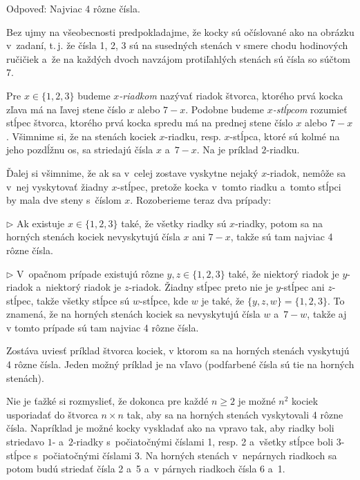 {%
Odpoveď: Najviac 4 rôzne čísla.

Bez ujmy na všeobecnosti predpokladajme, že kocky sú očíslované ako na obrázku v~zadaní, t.\,j. že čísla 1, 2, 3 sú na susedných stenách v smere chodu hodinových ručičiek a~že na každých dvoch navzájom protiľahlých stenách sú čísla so súčtom 7.

Pre $x \in \{1, 2, 3\}$ budeme {\it $x$-riadkom} nazývať riadok štvorca, ktorého prvá kocka zľava má na ľavej stene číslo $x$ alebo $7 - x$.
Podobne budeme {\it $x$-stĺpcom} rozumieť stĺpec štvorca, ktorého prvá kocka spredu má na prednej stene číslo $x$ alebo $7 - x$.
Všimnime si, že na stenách kociek $x$-riadku, resp. $x$-stĺpca, ktoré sú kolmé na jeho pozdĺžnu os, sa striedajú čísla $x$ a~$7 - x$. Na \obrplus\obr{} je príklad $2$-riadku.
%

Ďalej si všimnime, že ak sa v~celej zostave vyskytne nejaký $x$-riadok, nemôže sa v~nej vyskytovať žiadny $x$-stĺpec, pretože kocka v~tomto riadku a~tomto stĺpci by mala dve steny s~číslom $x$. Rozoberieme teraz dva prípady:

\smallskip

\item{$\triangleright$}
Ak existuje $x \in \{1, 2, 3\}$ také, že všetky riadky sú $x$-riadky, potom sa na horných stenách kociek nevyskytujú čísla $x$ ani $7 - x$, takže sú tam najviac 4 rôzne čísla.

\item{$\triangleright$}
V~opačnom prípade existujú rôzne $y,z\in \{1, 2, 3\}$ také, že niektorý riadok je \hbox{$y$-riadok} a~niektorý riadok je $z$-riadok. Žiadny stĺpec preto nie je $y$-stĺpec ani \hbox{$z$-stĺpec}, takže všetky stĺpce sú $w$-stĺpce, kde $w$ je také, že $\{y, z, w\} = \{1, 2, 3\}$. To znamená, že na horných stenách kociek sa nevyskytujú čísla $w$ a~$7 - w$, takže aj v tomto prípade sú tam najviac 4 rôzne čísla.

\smallskip\noindent

Zostáva uviesť príklad štvorca kociek, v ktorom sa na horných stenách vyskytujú 4 rôzne čísla. Jeden možný príklad je na \obr{} vľavo (podfarbené čísla sú tie na horných stenách).
%

\poznamka
Nie je ťažké si rozmyslieť, že dokonca pre každé $n\ge 2$ je možné $n^2$ kociek usporiadať do štvorca $n\times n$ tak, aby sa na horných stenách vyskytovali 4 rôzne čísla. Napríklad je možné kocky vyskladať ako na  vpravo tak, aby riadky boli striedavo $1$- a~$2$-riadky s~počiatočnými číslami 1, resp. 2 a~všetky stĺpce boli $3$-stĺpce s~počiatočnými číslami 3. Na horných stenách v~nepárnych riadkoch sa potom budú striedať čísla 2 a~5 a~v párnych riadkoch čísla 6 a~1.


}
